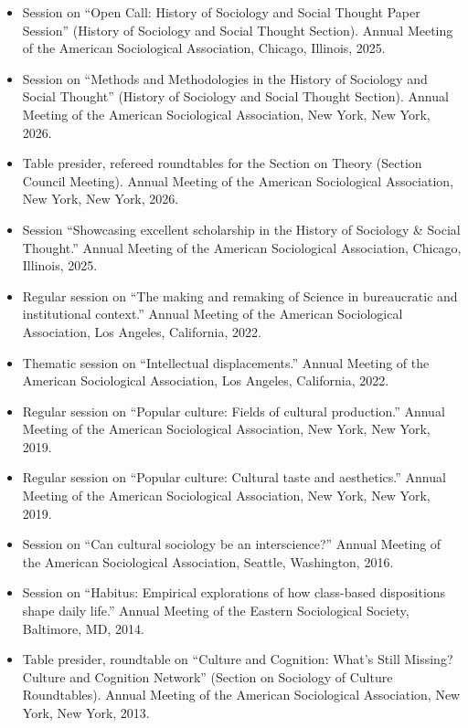 \documentclass[
]{article}
\begin{document}
\begin{itemize}
\item
  Session on ``Open Call: History of Sociology and Social Thought Paper
  Session'' (History of Sociology and Social Thought Section). Annual
  Meeting of the American Sociological Association, Chicago, Illinois,
  2025.
\item
  Session on ``Methods and Methodologies in the History of Sociology and
  Social Thought'' (History of Sociology and Social Thought Section).
  Annual Meeting of the American Sociological Association, New York, New
  York, 2026.
\item
  Table presider, refereed roundtables for the Section on Theory
  (Section Council Meeting). Annual Meeting of the American Sociological
  Association, New York, New York, 2026.
\item
  Session ``Showcasing excellent scholarship in the History of Sociology
  \& Social Thought.'' Annual Meeting of the American Sociological
  Association, Chicago, Illinois, 2025.
\item
  Regular session on ``The making and remaking of Science in
  bureaucratic and institutional context.'' Annual Meeting of the
  American Sociological Association, Los Angeles, California, 2022.
\item
  Thematic session on ``Intellectual displacements.'' Annual Meeting of
  the American Sociological Association, Los Angeles, California, 2022.
\item
  Regular session on ``Popular culture: Fields of cultural production.''
  Annual Meeting of the American Sociological Association, New York, New
  York, 2019.
\item
  Regular session on ``Popular culture: Cultural taste and aesthetics.''
  Annual Meeting of the American Sociological Association, New York, New
  York, 2019.
\item
  Session on ``Can cultural sociology be an interscience?'' Annual
  Meeting of the American Sociological Association, Seattle, Washington,
  2016.
\item
  Session on ``Habitus: Empirical explorations of how class-based
  dispositions shape daily life.'' Annual Meeting of the Eastern
  Sociological Society, Baltimore, MD, 2014.
\item
  Table presider, roundtable on ``Culture and Cognition: What's Still
  Missing? Culture and Cognition Network'' (Section on Sociology of
  Culture Roundtables). Annual Meeting of the American Sociological
  Association, New York, New York, 2013.

\end{itemize}
\end{document}
